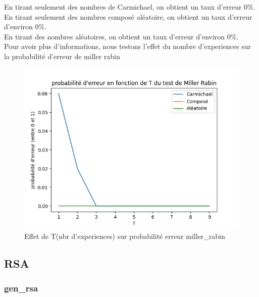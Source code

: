 \documentclass{article}
\begin{document}
En tirant seulement des nombres de Carmichael, on obtient un taux d'erreur 0\%.\\
En tirant seulement des nombres composé aléatoire, on obtient un taux d'erreur d'environ 0\%.\\
En tirant des nombres aléatoires, on obtient un taux d'erreur d'environ 0\%.\\

Pour avoir plus d'informations, nous testons l'effet du nombre d'experiences sur la probabilité d'erreur de miller rabin


 \begin{figure}[H]
    \centering
     \includegraphics[scale=0.4]{miller_rabin_test_T.png}
     \caption{\centering Effet de T(nbr d'experiences) sur probabilité erreur miller\_rabin}
 \end{figure}

 
\subsection{RSA}

\subsubsection{gen\_rsa}
\end{document}
